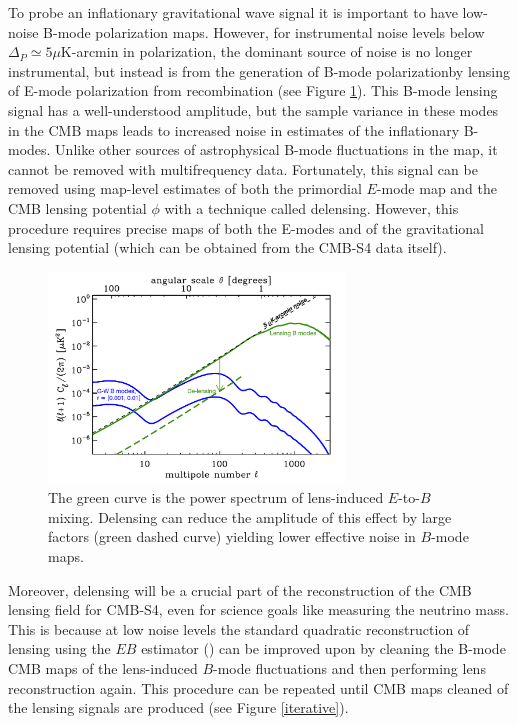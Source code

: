 To probe an inflationary gravitational wave signal it is important to have low-noise B-mode polarization maps. However, for instrumental noise levels below $\Delta_P \simeq 5 \mu$K-arcmin in polarization, the dominant source of noise is no longer instrumental, but instead is from the generation of B-mode polarizationby lensing of E-mode polarization from recombination (see Figure \ref{snowmssDelens}).  This B-mode lensing signal has a well-understood amplitude, but the sample variance in these modes in the CMB maps leads to increased noise in estimates of the inflationary B-modes. Unlike other sources of astrophysical B-mode fluctuations in the map, it cannot be removed with multifrequency data.  Fortunately, this signal can be removed using map-level estimates of both the primordial $E$-mode map and the CMB lensing potential $\phi$ with a technique called delensing. However, this procedure requires
precise maps of both the E-modes and of the gravitational lensing potential
(which can be obtained from the CMB-S4 data itself).

\begin{figure}[htbp]
\centering
\includegraphics[width=0.7\textwidth]{CMBLensing/cmb_powspec_for_s4scibooklensing.pdf}
\caption{The green curve is the power spectrum of lens-induced $E$-to-$B$ mixing.  Delensing can reduce the amplitude of this effect by large factors (green dashed curve) yielding lower effective noise in $B$-mode maps.}
\label{snowmssDelens}
\end{figure}


Moreover, delensing will be a crucial part of the reconstruction of the CMB lensing field for CMB-S4, even for science goals like measuring the neutrino mass.  This is because at low noise levels the standard quadratic reconstruction of lensing using the $EB$ estimator (\cite{Hu:2001kj}) can be improved upon by cleaning the B-mode CMB maps of the lens-induced $B$-mode fluctuations and then performing lens reconstruction again.  This procedure can be repeated until CMB maps cleaned of the lensing signals are produced (see Figure \ref{iterative}).  

